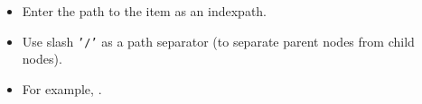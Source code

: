 \begin{itemize}
\item Enter the path to the item as an indexpath.
\item Use slash {\tt '/'} as a path separator (to separate parent nodes from child nodes).
\item For example, . 

  \end{itemize}
